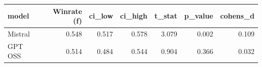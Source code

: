 \begin{tabular}{lrrrrrr}
\toprule
model & Winrate (f) & ci\_low & ci\_high & t\_stat & p\_value & cohens\_d \\
\midrule
Mistral & 0.548 & 0.517 & 0.578 & 3.079 & 0.002 & 0.109 \\
GPT OSS & 0.514 & 0.484 & 0.544 & 0.904 & 0.366 & 0.032 \\
\bottomrule
\end{tabular}
